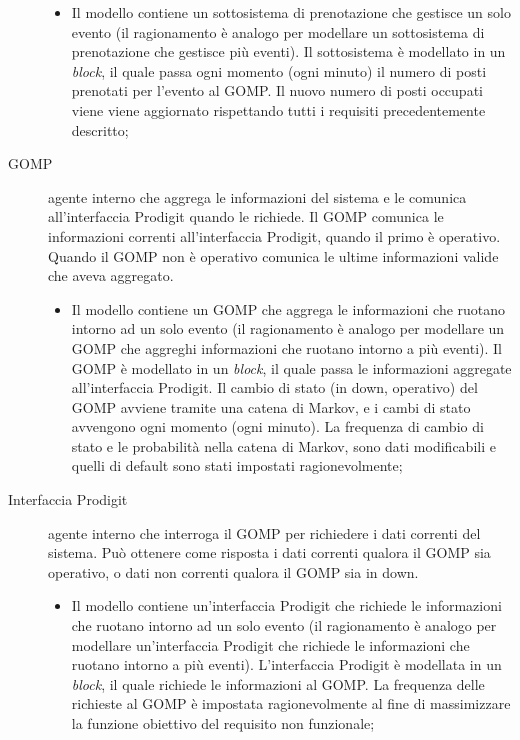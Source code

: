 \documentclass[11pt]{article}
\begin{document}
\begin{description}
		\begin{itemize}
			\itemsep0em
			\item Il modello contiene un sottosistema di prenotazione che gestisce un solo evento (il ragionamento è analogo per modellare un sottosistema di prenotazione che gestisce più eventi). Il sottosistema è modellato in un \textit{block}, il quale passa ogni momento (ogni minuto) il numero di posti prenotati per l'evento al GOMP. Il nuovo numero di posti occupati viene viene aggiornato rispettando tutti i requisiti precedentemente descritto;
		\end{itemize}
		\item [GOMP] agente interno che aggrega le informazioni del sistema e le comunica all'interfaccia Prodigit quando le richiede. Il GOMP comunica le informazioni correnti all'interfaccia Prodigit, quando il primo è operativo. Quando il GOMP non è operativo comunica le ultime informazioni valide che aveva aggregato.
		\begin{itemize}
			\itemsep0em
			\item Il modello contiene un GOMP che aggrega le informazioni che ruotano intorno ad un solo evento (il ragionamento è analogo per modellare un GOMP che aggreghi informazioni che ruotano intorno a più eventi). Il GOMP è modellato in un \textit{block}, il quale passa le informazioni aggregate all'interfaccia Prodigit. Il cambio di stato (in down, operativo) del GOMP avviene tramite una catena di Markov, e i cambi di stato avvengono ogni momento (ogni minuto). La frequenza di cambio di stato e le probabilità nella catena di Markov, sono dati modificabili e quelli di default sono stati impostati ragionevolmente;
		\end{itemize}
		\item [Interfaccia Prodigit] agente interno che interroga il GOMP per richiedere i dati correnti del sistema. Può ottenere come risposta i dati correnti qualora il GOMP sia operativo, o dati non correnti qualora il GOMP sia in down.
		\begin{itemize}
			\itemsep0em
			\item Il modello contiene un'interfaccia Prodigit che richiede le informazioni che ruotano intorno ad un solo evento (il ragionamento è analogo per modellare un'interfaccia Prodigit che richiede le informazioni che ruotano intorno a più eventi). L'interfaccia Prodigit è modellata in un \textit{block}, il quale richiede le informazioni al GOMP. La frequenza delle richieste al GOMP è impostata ragionevolmente al fine di massimizzare la funzione obiettivo del requisito non funzionale;

\end{itemize}
\end{description}
\end{document}
